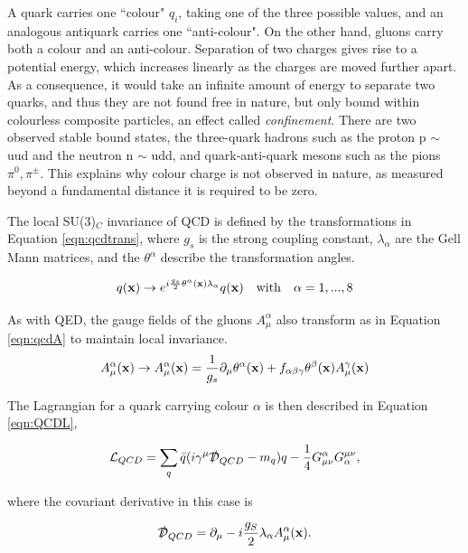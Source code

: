A quark carries one ``colour" $q_{i}$, taking one of the three possible values, and an analogous antiquark carries one ``anti-colour". On the other hand, gluons carry both a colour and an anti-colour.  Separation of two charges gives rise to a potential energy, which increases linearly as the charges are moved further apart. As a consequence, it would take an infinite amount of energy to separate two quarks, and thus they are not found free in nature, but only bound within colourless composite particles, an effect called \textit{confinement}. There are two observed stable bound states, the three-quark hadrons such as the proton p $\sim$ uud and the neutron n $\sim$ udd, and quark-anti-quark mesons such as the pions $\pi^{0}, \pi^{\pm}$. This explains why colour charge is not observed in nature, as measured beyond a fundamental distance it is required to be zero.

The local SU(3)$_{C}$ invariance of QCD is defined by the transformations in Equation \ref{eqn:qcdtrans}, where $g_{s}$ is the strong coupling constant, $\lambda_{\alpha}$ are the Gell Mann matrices, and the $\theta^{\alpha}$ describe the transformation angles. 

\begin{equation}
q(\mathbf{x}) \rightarrow e^{i\frac{g_{s}}{2}\theta^{\alpha}(\mathbf{x}) \lambda_{\alpha}} q(\mathbf{x}) \quad \mathrm{with} \quad \alpha = 1, ... , 8
\label{eqn:qcdtrans}
\end{equation}


As with QED, the gauge fields of the gluons $A^{\alpha}_{\mu} $ also transform as in Equation \ref{eqn:qcdA} to maintain local invariance. 
\begin{equation}
A^{\alpha}_{\mu}(\mathbf{x}) \rightarrow A^{\alpha}_{\mu}(\mathbf{x}) = \frac{1}{g_{s}} \partial_{\mu}\theta^{\alpha}(\mathbf{x}) + f_{\alpha \beta \gamma}\theta^{\beta}(\mathbf{x})A^{\gamma}_{\mu}(\mathbf{x})
\label{eqn:qcdA}
\end{equation}


The Lagrangian for a quark carrying colour $\alpha$ is then described in Equation \ref{eqn:QCDL},

\begin{equation}
{\mathcal{L}}_{QCD} = \sum_{q} \bar{q}(i \gamma^{\mu}\slashed{\mathcal{D}}_{QCD} - m_{q}) q - \frac{1}{4}G^{\alpha}_{\mu \nu}G^{\mu \nu}_{\alpha},
\label{eqn:QCDL}
\end{equation}

where the covariant derivative in this case is


\begin{equation}
\slashed{\Dev}_{QCD} = \partial_{\mu} - i\frac{g_{S}}{2}\lambda_{\alpha}A^{\alpha}_{\mu}(\stc).
\label{eqn:QCDD}
\end{equation}

